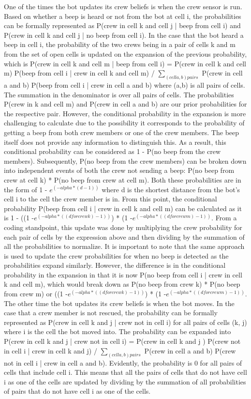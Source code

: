 \documentclass[11pt]{article}
\begin{document}
One of the times the bot updates its crew beliefs is when the crew sensor is run. Based on whether a beep is heard or not from the bot at cell i, the probabilities can be formally represented as P(crew in cell k and cell j | beep from cell i) and P(crew in cell k and cell j | no beep from cell i). In the case that the bot heard a beep in cell i, the probability of the two crews being in a pair of cells k and m from the set of open cells is updated on the expansion of the previous probability, which is P(crew in cell k and cell m | beep from cell i) = P(crew in cell k and cell m) P(beep from cell i | crew in cell k and cell m)  / $\sum_{(cell a, b) pairs}$ P(crew in cell a and b) P(beep from cell i | crew in cell a and b) where (a,b) is all pairs of cells. The summation in the denominator is over all pairs of cells. The probabilities P(crew in k and cell m) and P(crew in cell a and b) are our prior probabilities for the respective pair. However, the conditional probability in the expansion is more challenging to calculate due to the possibility it corresponds to the probability of getting a beep from both crew members or one of the crew members. The beep itself does not provide any information to distinguish this. As a result, this conditional probability can be considered as 1 - P(no beep from the crew members). Subsequently, P(no beep from the crew members) can be broken down into independent events of both the crew not sending a beep: P(no beep from crew at cell k) * P(no beep from crew at cell m). Both these probabilities are in the form of 1 - $e^{(-alpha * (d-1))}$ where d is the shortest distance from the bot's cell i to the cell the crew member is in. From this point, the conditional probability P(beep from cell i | crew in cell k and cell m) can be calculated as it is 1 - ((1 -$e^{(-alpha * ((d for crew k)-1))}$) * (1 -$e^{(-alpha * ((d for crew m)-1))}$. From a coding standpoint, this update was done by multiplying the crew probability for each pair of cells by the expression above and then dividing by the summation of all the probabilities to normalize. It is important to note that the same approach is used to update the crew probabilities for when no beep is detected as the probabilities expand similarly. However, the difference is in the conditional probability in the expansion in that it is now P(no beep from cell i | crew in cell k and cell m), which would break down as P(no beep from crew k) * P(no beep from crew m) or ((1 -$e^{(-alpha * ((d for crew k)-1))}$) * (1 -$e^{(-alpha * ((d for crew m)-1))}$. 
\medskip
The other time the bot updates its crew beliefs is when the bot moves. In the case that a crew member is not rescued, the probability can be formally represented as P(crew in cell k and j | crew not in cell i) for all pairs of cells (k, j) where i is the cell the bot moved into. The probability can be expanded into P(crew in cell k and j | crew not in cell i) = P(crew in cell k and j ) P(crew not in cell i | crew in cell k and j) / $\sum_{(cell a, b) pairs}$ P(crew in cell a and b) P(crew not in cell i | crew in cell a and b). Evidently, the probability is 0 for all pairs of cells that include cell i. This means that all the pairs of cells that do not have cell i as one of the cells are updated by dividing by the summation of all probabilities of pairs that do not have cell i as one of the cells.
\end{document}
